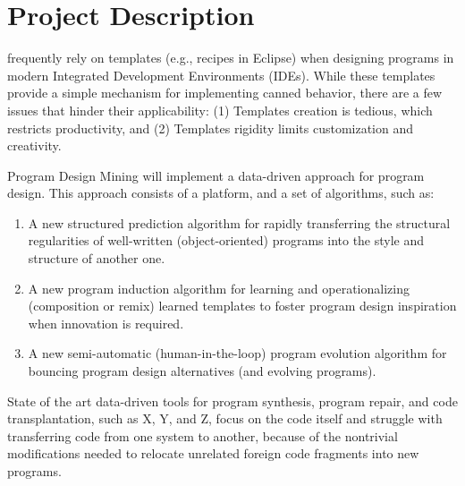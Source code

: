 \chapter{Project Description}{}
\label{sec:related}

 frequently rely on templates (e.g., 
recipes in Eclipse) when designing programs in modern Integrated 
Development Environments (IDEs). While these templates provide 
a simple mechanism for implementing canned behavior, there are a 
few issues that hinder their applicability: (1) Templates creation 
is tedious, which restricts productivity, and (2) Templates rigidity 
limits customization and creativity.

Program Design Mining will implement a data-driven approach for 
program design. This approach consists of a platform, and a set of 
algorithms, such as: 

\begin{enumerate}
	\item A new structured prediction algorithm for rapidly transferring 
	the structural regularities of well-written (object-oriented) programs 
	into the style and structure of another one.
	\item A new program induction algorithm for learning and operationalizing 
	(composition or remix) learned templates to foster program design 
	inspiration when innovation is required.
	\item A new semi-automatic (human-in-the-loop) program evolution algorithm 
	for bouncing program design alternatives (and evolving programs). 
\end{enumerate}

State of the art data-driven tools for program synthesis, program 
repair, and code transplantation, such as X, Y, and Z, focus 
on the code itself and struggle with transferring code from one system 
to another, because of the nontrivial modifications needed to relocate 
unrelated foreign code fragments into new programs. 
